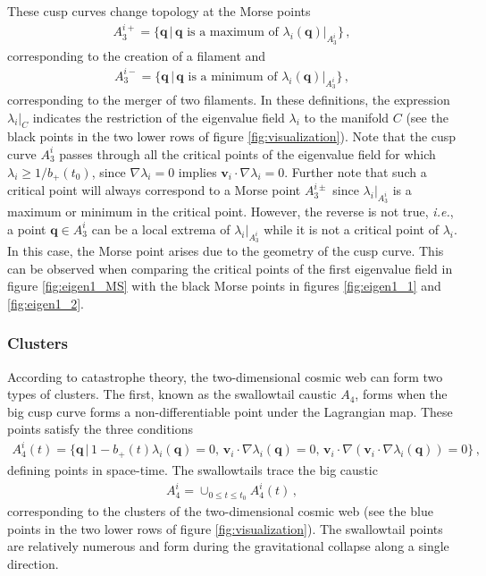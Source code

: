 \documentclass[a4paper, 11pt]{article}
\begin{document}
These cusp curves change topology at the Morse points
\begin{align}
A_3^{i+} = \{\bm{q}\,|\,\bm{q} \text{ is a maximum of } \lambda_i(\bm{q})|_{A_3^i}\}\,,
\end{align}
corresponding to the creation of a filament and
\begin{align}
A_3^{i-} = \{\bm{q}\,|\,\bm{q} \text{ is a minimum of } \lambda_i(\bm{q})|_{A_3^i}\}\,,
\end{align}
corresponding to the merger of two filaments. In these definitions, the expression $\lambda_i|_C$ indicates the restriction of the eigenvalue field $\lambda_i$ to the manifold $C$ (see the black points in the two lower rows of figure \ref{fig:visualization}). Note that the cusp curve $A_3^i$ passes through all the critical points of the eigenvalue field for which $\lambda_i \geq 1/b_+(t_0)$, since $\nabla \lambda_i=0$ implies $\bm{v}_i \cdot \nabla \lambda_i=0$. Further note that such a critical point will always correspond to a Morse point $A_3^{i\pm}$ since $\lambda_i|_{A_3^i}$ is a maximum or minimum in the critical point. However, the reverse is not true, \textit{i.e.}, a point $\bm{q} \in A_3^i$ can be a local extrema of $\lambda_i|_{A_3^i}$ while it is not a critical point of $\lambda_i$. In this case, the Morse point arises due to the geometry of the cusp curve. This can be observed when comparing the critical points of the first eigenvalue field in figure \ref{fig:eigen1_MS} with the black Morse points in figures \ref{fig:eigen1_1} and \ref{fig:eigen1_2}.

\subsubsection{Clusters}
According to catastrophe theory, the two-dimensional cosmic web can form two types of clusters. The first, known as the swallowtail caustic $A_4$, forms when the big cusp curve forms a non-differentiable point under the Lagrangian map. These points satisfy the three conditions
\begin{align}
A_4^i(t)=\{\bm{q}\,|\,
1- b_+(t)\lambda_i(\bm{q})=0,\,
 \bm{v}_i \cdot \nabla \lambda_i(\bm{q}) = 0,\,
 \bm{v}_i \cdot \nabla(\bm{v}_i \cdot \nabla \lambda_i(\bm{q})) = 0\}\,,
\end{align}
defining points in space-time. The swallowtails trace the big caustic
\begin{align}
A_4^i = \cup_{0 \leq t \leq t_0} A_4^i(t)\,,
\end{align}
corresponding to the clusters of the two-dimensional cosmic web (see the blue points in the two lower rows of figure \ref{fig:visualization}). The swallowtail points are relatively numerous and form during the gravitational collapse along a single direction.
\end{document}

